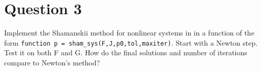 \section{Question 3}

\begin{question}
    Implement the Shamanskii method for nonlinear systems in \MATLAB in a function of the form \verb+function p = sham_sys(F,J,p0,tol,maxiter)+. Start with a Newton step. Test it on both F and G. How do the final solutions and number of iterations compare to Newton’s method?
\end{question}

\begin{answer}
    
\end{answer}
